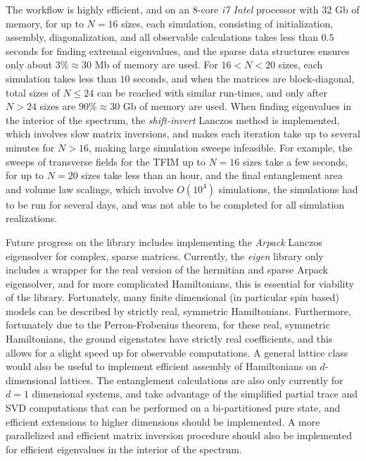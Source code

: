 \documentclass[12pt]{article}{}
\begin{document}
The workflow is highly efficient, and on an $8$-core \emph{i7 Intel} processor with $32$ Gb of memory, for up to $N=16$ sizes, each simulation, consisting of initialization, assembly, diagonalization, and all observable calculations takes less than $0.5$ seconds for finding extremal eigenvalues, and the sparse data structures ensures only about $3\% \approx 30$ Mb of memory are used. For $16 < N < 20$ sizes, each simulation takes less than $10$ seconds, and when the matrices are block-diagonal, total sizes of $N \leq 24$ can be reached with similar run-times, and only after $ N>24$ sizes are $90\% \approx 30$ Gb of memory are used. When finding eigenvalues in the interior of the spectrum, the \emph{shift-invert} Lanczos method is implemented, which involves slow matrix inversions, and makes each iteration take up to several minutes for $N>16$, making large simulation sweeps infeasible. For example, the sweeps of transverse fields for the TFIM up to $N=16$ sizes take a few seconds, for up to $N=20$ sizes take less than an hour, and the final entanglement area and volume law scalings, which involve $O(10^4)$ simulations, the simulations had to be run for several days, and was not able to be completed for all simulation realizations.

Future progress on the library includes implementing the \emph{Arpack} Lanczos eigensolver for complex, sparse matrices. Currently, the \emph{eigen} library only includes a wrapper for the real version of the hermitian and sparse Arpack eigensolver, and for more complicated Hamiltonians, this is essential for viability of the library. Fortunately, many finite dimensional (in particular spin based) models can be described by strictly real, symmetric Hamiltonians. Furthermore, fortunately due to the Perron-Frobenius theorem, for these real, symmetric Hamiltonians, the ground eigenstates have strictly real coefficients, and this allows for a slight speed up for observable computations. A general lattice class would also be useful to implement efficient assembly of Hamiltonians on $d$-dimensional lattices. The entanglement calculations are also only currently for $d=1$ dimensional systems, and take advantage of the simplified partial trace and SVD computations that can be performed on a bi-partitioned pure state, and efficient extensions to higher dimensions should be implemented. A more parallelized and efficient matrix inversion procedure should also be implemented for efficient eigenvalues in the interior of the spectrum.


\newpage
\end{document}
